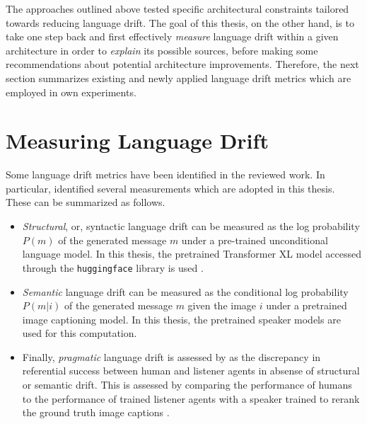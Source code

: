 The approaches outlined above tested specific architectural constraints tailored towards reducing language drift. The goal of this thesis, on the other hand, is to take one step back and first effectively \textit{measure} language drift within a given architecture in order to \textit{explain} its possible sources, before making some recommendations about potential architecture improvements. Therefore, the next section summarizes existing and newly applied language drift metrics which are employed in own experiments. 

\section{Measuring Language Drift}
\label{ld_metrics}

Some language drift metrics have been identified in the reviewed work. In particular, \cite{lazaridou2020multi} identified several measurements which are adopted in this thesis. These can be summarized as follows. 
\begin{itemize}
	\item \textit{Structural}, or, syntactic language drift can be measured as the log probability $P(m)$ of the generated message $m$ under a pre-trained unconditional language model. In this thesis, the pretrained Transformer XL model accessed through the \texttt{huggingface} library is used \parencite{dai2019transformer, wolf2019huggingface}.
	\item \textit{Semantic} language drift can be measured as the conditional log probability $P(m|i)$ of the generated message $m$ given the image $i$ under a pretrained image captioning model. In this thesis, the pretrained speaker models are used for this computation. %
	\item Finally, \textit{pragmatic} language drift is assessed by \cite{lazaridou2020multi} as the discrepancy in referential success between human and listener agents in absense of structural or semantic drift. This is assessed by comparing the performance of humans to the performance of trained listener agents with a speaker trained to rerank the ground truth image captions \parencite{lazaridou2020multi}. 
\end{itemize}

